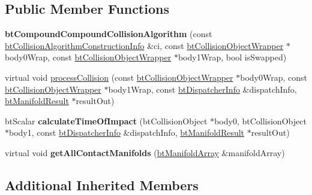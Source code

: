 \subsection*{Public Member Functions}
\begin{DoxyCompactItemize}
\item 
\hypertarget{classbt_compound_compound_collision_algorithm_a9e1acc0d58db97d05fc44f0a5591a2e5}{{\bfseries bt\+Compound\+Compound\+Collision\+Algorithm} (const \hyperlink{structbt_collision_algorithm_construction_info}{bt\+Collision\+Algorithm\+Construction\+Info} \&ci, const \hyperlink{structbt_collision_object_wrapper}{bt\+Collision\+Object\+Wrapper} $\ast$body0\+Wrap, const \hyperlink{structbt_collision_object_wrapper}{bt\+Collision\+Object\+Wrapper} $\ast$body1\+Wrap, bool is\+Swapped)}\label{classbt_compound_compound_collision_algorithm_a9e1acc0d58db97d05fc44f0a5591a2e5}

\item 
virtual void \hyperlink{classbt_compound_compound_collision_algorithm_a5fb9d60f9713c0e3795c89390353beb3}{process\+Collision} (const \hyperlink{structbt_collision_object_wrapper}{bt\+Collision\+Object\+Wrapper} $\ast$body0\+Wrap, const \hyperlink{structbt_collision_object_wrapper}{bt\+Collision\+Object\+Wrapper} $\ast$body1\+Wrap, const \hyperlink{structbt_dispatcher_info}{bt\+Dispatcher\+Info} \&dispatch\+Info, \hyperlink{classbt_manifold_result}{bt\+Manifold\+Result} $\ast$result\+Out)
\item 
\hypertarget{classbt_compound_compound_collision_algorithm_a6341a601d82d44850bea7b45f22ff971}{bt\+Scalar {\bfseries calculate\+Time\+Of\+Impact} (bt\+Collision\+Object $\ast$body0, bt\+Collision\+Object $\ast$body1, const \hyperlink{structbt_dispatcher_info}{bt\+Dispatcher\+Info} \&dispatch\+Info, \hyperlink{classbt_manifold_result}{bt\+Manifold\+Result} $\ast$result\+Out)}\label{classbt_compound_compound_collision_algorithm_a6341a601d82d44850bea7b45f22ff971}

\item 
\hypertarget{classbt_compound_compound_collision_algorithm_af9cb74c252d4fd42b7d44738154ba501}{virtual void {\bfseries get\+All\+Contact\+Manifolds} (\hyperlink{classbt_aligned_object_array}{bt\+Manifold\+Array} \&manifold\+Array)}\label{classbt_compound_compound_collision_algorithm_af9cb74c252d4fd42b7d44738154ba501}

\end{DoxyCompactItemize}
\subsection*{Additional Inherited Members}


